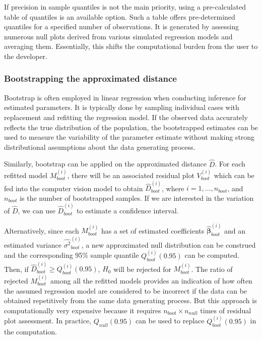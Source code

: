 \documentclass[]{interact}
\theoremstyle{plain}%
\theoremstyle{definition}
\theoremstyle{remark}
\begin{document}
If precision in sample quantiles is not the main priority, using a
pre-calculated table of quantiles is an available option. Such a table
offers pre-determined quantiles for a specified number of observations.
It is generated by assessing numerous null plots derived from various
simulated regression models and averaging them. Essentially, this shifts
the computational burden from the user to the developer.

\hypertarget{bootstrapping-the-approximated-distance}{%
\subsubsection{Bootstrapping the approximated
distance}\label{bootstrapping-the-approximated-distance}}

Bootstrap is often employed in linear regression when conducting
inference for estimated parameters. It is typically done by sampling
individual cases with replacement and refitting the regression model. If
the observed data accurately reflects the true distribution of the
population, the bootstrapped estimates can be used to measure the
variability of the parameter estimate without making strong
distributional assumptions about the data generating process.

Similarly, bootstrap can be applied on the approximated distance
\(\hat{D}\). For each refitted model \(M_{boot}^{(i)}\), there will be
an associated residual plot \(V_{boot}^{(i)}\) which can be fed into the
computer vision model to obtain \(\hat{D}_{boot}^{(i)}\), where
\(i = 1,...,n_{boot}\), and \(n_{boot}\) is the number of bootstrapped
samples. If we are interested in the variation of \(\hat{D}\), we can
use \(\hat{D}_{boot}^{(i)}\) to estimate a confidence interval.

Alternatively, since each \(M_{boot}^{(i)}\) has a set of estimated
coefficients \(\hat{\boldsymbol{\beta}}_{boot}^{(i)}\) and an estimated
variance \(\hat{\sigma^2}_{boot}^{(i)}\), a new approximated null
distribution can be construed and the corresponding 95\% sample quantile
\(Q_{boot}^{(i)}(0.95)\) can be computed. Then, if
\(\hat{D}_{boot}^{(i)} \geq Q_{boot}^{(i)}(0.95)\), \(H_0\) will be
rejected for \(M_{boot}^{(i)}\). The ratio of rejected
\(M_{boot}^{(i)}\) among all the refitted models provides an indication
of how often the assumed regression model are considered to be incorrect
if the data can be obtained repetitively from the same data generating
process. But this approach is computationally very expensive because it
requires \(n_{boot} \times n_{null}\) times of residual plot assessment.
In practice, \(Q_{null}(0.95)\) can be used to replace
\(Q_{boot}^{(i)}(0.95)\) in the computation.
\end{document}
